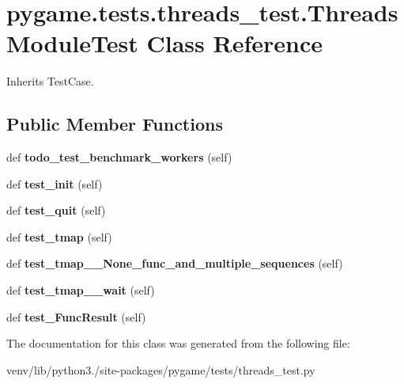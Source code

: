 \hypertarget{classpygame_1_1tests_1_1threads__test_1_1_threads_module_test}{}\section{pygame.\+tests.\+threads\+\_\+test.\+Threads\+Module\+Test Class Reference}
\label{classpygame_1_1tests_1_1threads__test_1_1_threads_module_test}


Inherits Test\+Case.

\subsection*{Public Member Functions}
\begin{DoxyCompactItemize}
\item 
\mbox{\label{classpygame_1_1tests_1_1threads__test_1_1_threads_module_test_af8d2f7fe5d01f000a5d610503223edf9}} 
def {\bfseries todo\+\_\+test\+\_\+benchmark\+\_\+workers} (self)
\item 
\mbox{\label{classpygame_1_1tests_1_1threads__test_1_1_threads_module_test_a3e267b40161a576b868a8554cf3ab7d7}} 
def {\bfseries test\+\_\+init} (self)
\item 
\mbox{\label{classpygame_1_1tests_1_1threads__test_1_1_threads_module_test_a2a1e04d2450425c42581360ee87801a0}} 
def {\bfseries test\+\_\+quit} (self)
\item 
\mbox{\label{classpygame_1_1tests_1_1threads__test_1_1_threads_module_test_a94926c6b8c554ecb76f1d130ff33a481}} 
def {\bfseries test\+\_\+tmap} (self)
\item 
\mbox{\label{classpygame_1_1tests_1_1threads__test_1_1_threads_module_test_afa79d99d2956fa4adb911d214950d03f}} 
def {\bfseries test\+\_\+tmap\+\_\+\+\_\+\+None\+\_\+func\+\_\+and\+\_\+multiple\+\_\+sequences} (self)
\item 
\mbox{\label{classpygame_1_1tests_1_1threads__test_1_1_threads_module_test_ad2d32f34d5c90f33936a277e5833e127}} 
def {\bfseries test\+\_\+tmap\+\_\+\+\_\+wait} (self)
\item 
\mbox{\label{classpygame_1_1tests_1_1threads__test_1_1_threads_module_test_ac0991c43acccf2e3d7605ca0a3083db0}} 
def {\bfseries test\+\_\+\+Func\+Result} (self)
\end{DoxyCompactItemize}


The documentation for this class was generated from the following file\+:\begin{DoxyCompactItemize}
\item 
venv/lib/python3./site-\/packages/pygame/tests/threads\+\_\+test.\+py\end{DoxyCompactItemize}
